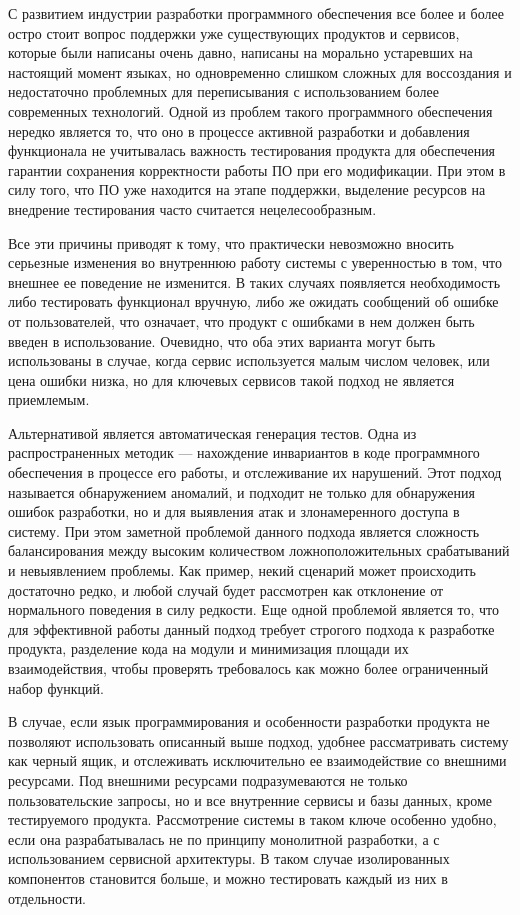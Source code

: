 С развитием индустрии разработки программного обеспечения все более и более
остро стоит вопрос поддержки уже существующих продуктов и сервисов, которые
были написаны очень давно, написаны на морально устаревших на настоящий момент
языках, но одновременно слишком сложных для воссоздания и недостаточно
проблемных для переписывания с использованием более современных технологий.
Одной из проблем такого программного обеспечения нередко является то, что
оно в процессе активной разработки и добавления функционала не учитывалась
важность тестирования продукта для обеспечения гарантии сохранения корректности
работы ПО при его модификации. При этом в силу того, что ПО уже находится на
этапе поддержки, выделение ресурсов на внедрение тестирования часто считается
нецелесообразным.

Все эти причины приводят к тому, что практически невозможно вносить серьезные
изменения во внутреннюю работу системы с уверенностью в том, что внешнее ее
поведение не изменится. В таких случаях появляется необходимость либо
тестировать функционал вручную, либо же ожидать сообщений об ошибке от
пользователей, что означает, что продукт с ошибками в нем должен быть введен
в использование. Очевидно, что оба этих варианта могут быть использованы в случае,
когда сервис используется малым числом человек, или цена ошибки низка, но для
ключевых сервисов такой подход не является приемлемым.

Альтернативой является автоматическая генерация тестов. Одна из распространенных
методик --- нахождение инвариантов в коде программного обеспечения в процессе
его работы, и отслеживание их нарушений. Этот подход называется обнаружением
аномалий, и подходит не только для обнаружения ошибок разработки, но и для
выявления атак и злонамеренного доступа в систему. При этом заметной проблемой
данного подхода является сложность балансирования между высоким количеством
ложноположительных срабатываний и невыявлением проблемы. Как пример, некий
сценарий может происходить достаточно редко, и любой случай будет рассмотрен
как отклонение от нормального поведения в силу редкости. Еще одной проблемой
является то, что для эффективной работы данный подход требует строгого подхода
к разработке продукта, разделение кода на модули и минимизация площади их
взаимодействия, чтобы проверять требовалось как можно более ограниченный набор
функций.

В случае, если язык программирования и особенности разработки продукта не
позволяют использовать описанный выше подход, удобнее рассматривать систему как
черный ящик, и отслеживать исключительно ее взаимодействие со внешними
ресурсами. Под внешними ресурсами подразумеваются не только пользовательские
запросы, но и все внутренние сервисы и базы данных, кроме тестируемого продукта.
Рассмотрение системы в таком ключе особенно удобно, если она разрабатывалась
не по принципу монолитной разработки, а с использованием сервисной архитектуры.
В таком случае изолированных компонентов становится больше, и можно тестировать
каждый из них в отдельности.

